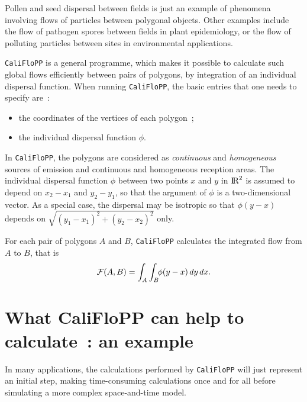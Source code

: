 Pollen and seed dispersal between fields is just an example of phenomena
involving flows of particles between polygonal objects. Other examples
include the flow of pathogen spores between fields in plant
epidemiology, or the flow of polluting particles between sites in
environmental applications.

\verb+CaliFloPP+ is a general programme, which makes it possible to
calculate such global flows efficiently between pairs of polygons, by
integration of an individual dispersal function. When running
\verb+CaliFloPP+, the basic entries that one needs to specify are~:
\begin{itemize}
\item the coordinates of the vertices of each polygon~;
\item the individual dispersal function $\phi$.
\end{itemize}

In \verb+CaliFloPP+, the polygons are considered as \emph{continuous}
and \emph{homogeneous} 
sources of emission and continuous and  homogeneous
reception areas. The individual
dispersal function $\phi$ between two points $x$ and $y$ in $\hbox{I}\!\hbox{R}^2$ is
assumed to depend on $x_2-x_1$ and $y_2-y_1$, so that the argument of
$\phi$ is a two-dimensional vector. As a special case, the dispersal may
be isotropic so that $\phi(y-x)$ depends on $\sqrt{(y_1-x_1)^2 +
  (y_2-x_2)^2}$ only. 
 
For each pair of polygons $A$ and $B$, \verb+CaliFloPP+ calculates
the integrated flow from $A$ to $B$, that is
\begin{equation}
  \label{eq:def:A}
  {\cal F}(A,B) = \int_A\int_B\!\! \phi(y-x)\,dy\,dx. 
\end{equation}

\section{What CaliFloPP can help to calculate~: an example}

In many applications, the calculations performed by \verb+CaliFloPP+
will just represent an initial step, making time-consuming calculations
once and for all before simulating a more complex space-and-time model.

